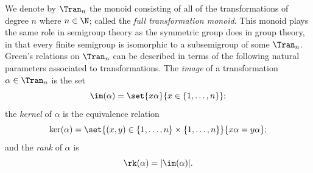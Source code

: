 We denote by $\Tran_n$ the monoid consisting of all of the transformations of
degree $n$ where $n\in \N$; called the \emph{full transformation monoid}.
This monoid plays the same role in semigroup theory as the symmetric group does
in group theory, in that every finite semigroup is isomorphic to a subsemigroup
of some $\Tran_n$. Green's relations on $\Tran_n$ can be described in terms of
the following natural parameters associated to transformations. The
\emph{image} of a transformation $\alpha\in \Tran_n$ is the set
\[\im(\alpha)=\set{x\alpha}{x\in\{1, \ldots, n\}};\]
the \emph{kernel} of $\alpha$ is the equivalence relation
\[\ker(\alpha)=\set{(x,y)\in\{1, \ldots, n\}\times\{1, \ldots,
n\}}{x\alpha=y\alpha};\]
and the \emph{rank} of $\alpha$ is
\[\rk(\alpha)=|\im(\alpha)|.\]
